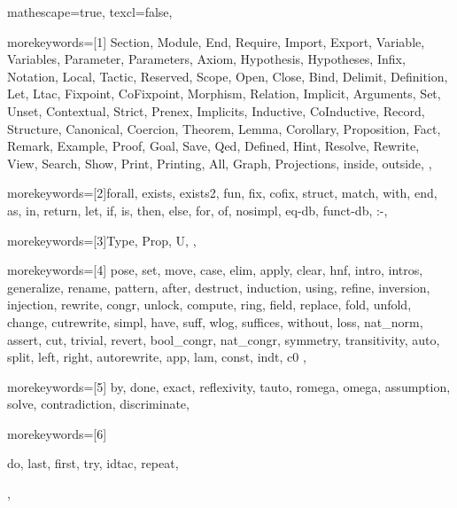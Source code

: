 
 {

mathescape=true,						
texcl=false,


morekeywords=[1]{
Section, Module, End, Require, Import, Export,
Variable, Variables, Parameter, Parameters, Axiom, Hypothesis, Hypotheses,
Infix, Notation, Local, Tactic, Reserved, Scope, Open, Close, Bind, Delimit,
Definition, Let, Ltac, Fixpoint, CoFixpoint, Morphism, Relation,
Implicit, Arguments, Set, Unset, Contextual, Strict, Prenex, Implicits,
Inductive, CoInductive, Record, Structure, Canonical, Coercion,
Theorem, Lemma, Corollary, Proposition, Fact, Remark, Example,
Proof, Goal, Save, Qed, Defined, Hint, Resolve, Rewrite, View,
Search, Show, Print, Printing, All, Graph, Projections, inside, outside,
},

morekeywords=[2]{forall, exists, exists2, fun, fix, cofix, struct,
      match, with, end, as, in, return, let, if, is, then, else,
      for, of, nosimpl, eq-db, funct-db, :-},

morekeywords=[3]{Type, Prop, U,
},

morekeywords=[4]{
         pose, set, move, case, elim, apply, clear,
            hnf, intro, intros, generalize, rename, pattern, after,
	    destruct, induction, using, refine, inversion, injection,
         rewrite, congr, unlock, compute, ring, field,
            replace, fold, unfold, change, cutrewrite, simpl,
         have, suff, wlog, suffices, without, loss, nat_norm,
            assert, cut, trivial, revert, bool_congr, nat_congr,
	 symmetry, transitivity, auto, split, left, right, autorewrite,
 app, lam, const, indt, c0
},        

morekeywords=[5]{
         by, done, exact, reflexivity, tauto, romega, omega,
         assumption, solve, contradiction, discriminate},


morekeywords=[6]{do, last, first, try, idtac, repeat,

},

}
